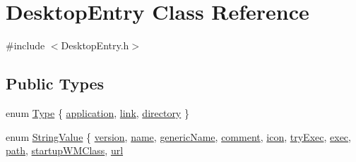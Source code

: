 \hypertarget{classDesktopEntry}{}\section{Desktop\+Entry Class Reference}
\label{classDesktopEntry}


{\ttfamily \#include $<$Desktop\+Entry.\+h$>$}

\subsection*{Public Types}
\begin{DoxyCompactItemize}
\item 
enum \mbox{\hyperlink{classDesktopEntry_ae14c5446e35cfe8ecdfb37d0523aa899}{Type}} \{ \mbox{\hyperlink{classDesktopEntry_ae14c5446e35cfe8ecdfb37d0523aa899a2b0cbb94e35b454c64631d9212e6343e}{application}}, 
\mbox{\hyperlink{classDesktopEntry_ae14c5446e35cfe8ecdfb37d0523aa899a21b204b08427b76f5b7b59e2633d1bda}{link}}, 
\mbox{\hyperlink{classDesktopEntry_ae14c5446e35cfe8ecdfb37d0523aa899a8da1c8cd0c764d440685aafa2efd3474}{directory}}
 \}
\item 
enum \mbox{\hyperlink{classDesktopEntry_a299e7c10728312fda6daf9ff926e3355}{String\+Value}} \{ \newline
\mbox{\hyperlink{classDesktopEntry_a299e7c10728312fda6daf9ff926e3355a252e7a192d3ac3a7ccefa74da202aaba}{version}}, 
\mbox{\hyperlink{classDesktopEntry_a299e7c10728312fda6daf9ff926e3355a354e5077480195cd40d67c21cb4733ce}{name}}, 
\mbox{\hyperlink{classDesktopEntry_a299e7c10728312fda6daf9ff926e3355a6ab2171382450516fd882442c3a97d6b}{generic\+Name}}, 
\mbox{\hyperlink{classDesktopEntry_a299e7c10728312fda6daf9ff926e3355acc956ea5747932ef71b073cd9f591ece}{comment}}, 
\newline
\mbox{\hyperlink{classDesktopEntry_a299e7c10728312fda6daf9ff926e3355ab5bcd9c96c62753a547c32e46bf73472}{icon}}, 
\mbox{\hyperlink{classDesktopEntry_a299e7c10728312fda6daf9ff926e3355ac3cb1f8833ef56948d4e95e8b606478c}{try\+Exec}}, 
\mbox{\hyperlink{classDesktopEntry_a299e7c10728312fda6daf9ff926e3355ab5446f799b8bd23a4096afc4882a1e71}{exec}}, 
\mbox{\hyperlink{classDesktopEntry_a299e7c10728312fda6daf9ff926e3355aedac3cdd270aed6a194daba03b2b3edf}{path}}, 
\newline
\mbox{\hyperlink{classDesktopEntry_a299e7c10728312fda6daf9ff926e3355ad50f8eb5518775fa13c27aa8ded766f2}{startup\+W\+M\+Class}}, 
\mbox{\hyperlink{classDesktopEntry_a299e7c10728312fda6daf9ff926e3355a53387cfb2e428f9da816b70eb7f2f1cf}{url}}

\end{DoxyCompactItemize}

